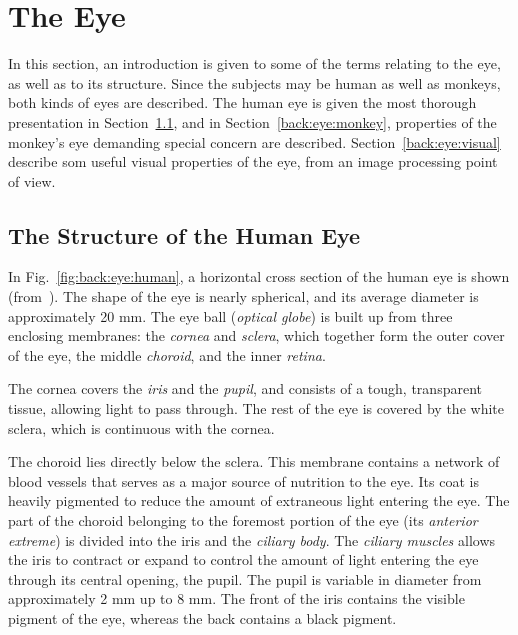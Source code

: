 
\section{The Eye}
\label{back:eye}

In this section, an introduction is given to some of the terms
relating to the eye, as well as to its structure.  Since the subjects
may be human as well as monkeys, both kinds of eyes are described.
The human eye is given the most thorough presentation in
Section~\ref{back:eye:human}, and in Section~\ref{back:eye:monkey},
properties of the monkey's eye demanding special concern are
described.  Section~\ref{back:eye:visual} describe som useful visual
properties of the eye, from an image processing point of view.

\subsection{The Structure of the Human Eye}
\label{back:eye:human}

In Fig.~\ref{fig:back:eye:human}, a horizontal cross section of the
human eye is shown (from~\cite{digim}).  The shape of the eye is
nearly spherical, and its average diameter is approximately 20 mm.
The eye ball ({\em optical globe\/}) is built up from three enclosing
membranes: the {\em cornea\/} and {\em sclera\/}, which together form
the outer cover of the eye, the middle {\em choroid\/}, and the inner
{\em retina\/}.  

The cornea covers the {\em iris\/} and the {\em pupil\/}, and consists
of a tough, transparent tissue, allowing light to pass through.  The
rest of the eye is covered by the white sclera, which is continuous
with the cornea.

The choroid lies directly below the sclera.  This membrane contains a
network of blood vessels that serves as a major source of nutrition to
the eye.  Its coat is heavily pigmented to reduce the amount of
extraneous light entering the eye.  The part of the choroid belonging
to the foremost portion of the eye (its {\em anterior extreme\/}) is
divided into the iris and the {\em ciliary body\/}.  The {\em ciliary
  muscles\/} allows the iris to contract or expand to control the
amount of light entering the eye through its central opening, the
pupil.  The pupil is variable in diameter from approximately 2 mm up
to 8 mm.  The front of the iris contains the visible pigment of the
eye, whereas the back contains a black pigment.

